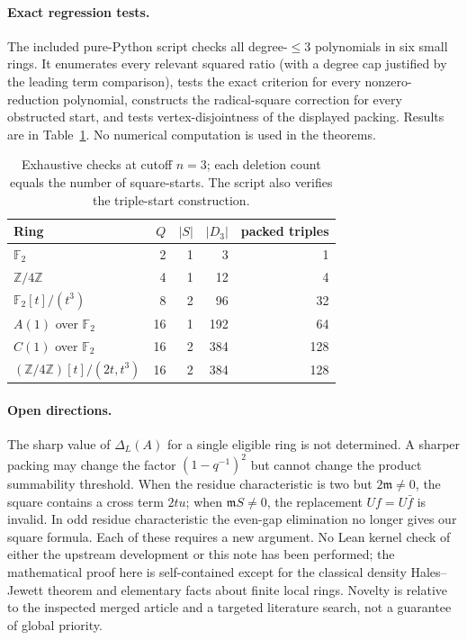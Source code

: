 \documentclass[11pt]{article}
\theoremstyle{remark}\newtheorem{remark}[theorem]{Remark}
\newcommand{\F}{\mathbb F}
\newcommand{\m}{\mathfrak m}
\begin{document}
\paragraph{Exact regression tests.} The included pure-Python script checks all degree-$\le3$ polynomials in six small rings. It enumerates every relevant squared ratio (with a degree cap justified by the leading term comparison), tests the exact criterion for every nonzero-reduction polynomial, constructs the radical-square correction for every obstructed start, and tests vertex-disjointness of the displayed packing. Results are in Table~\ref{tab:check}. No numerical computation is used in the theorems.
\begin{table}[ht]
\centering\small
\begin{tabular}{lrrrr}
\toprule
Ring & $Q$ & $|S|$ & $|D_3|$ & packed triples\\
\midrule
$\F_2$ & 2 & 1 & 3 & 1\\
$\mathbb Z/4\mathbb Z$ & 4 & 1 & 12 & 4\\
$\F_2[t]/(t^3)$ & 8 & 2 & 96 & 32\\
$A(1)$ over $\F_2$ & 16 & 1 & 192 & 64\\
$C(1)$ over $\F_2$ & 16 & 2 & 384 & 128\\
$(\mathbb Z/4\mathbb Z)[t]/(2t,t^3)$ & 16 & 2 & 384 & 128\\
\bottomrule
\end{tabular}
\caption{Exhaustive checks at cutoff $n=3$; each deletion count equals the number of square-starts. The script also verifies the triple-start construction.}\label{tab:check}
\end{table}

\paragraph{Open directions.} The sharp value of $\Delta_L(A)$ for a single eligible ring is not determined. A sharper packing may change the factor $(1-q^{-1})^2$ but cannot change the product summability threshold. When the residue characteristic is two but $2\m\ne0$, the square contains a cross term $2tu$; when $\m S\ne0$, the replacement $Uf=U\bar f$ is invalid. In odd residue characteristic the even-gap elimination no longer gives our square formula. Each of these requires a new argument. No Lean kernel check of either the upstream development or this note has been performed; the mathematical proof here is self-contained except for the classical density Hales--Jewett theorem and elementary facts about finite local rings. Novelty is relative to the inspected merged article and a targeted literature search, not a guarantee of global priority.
\end{document}
